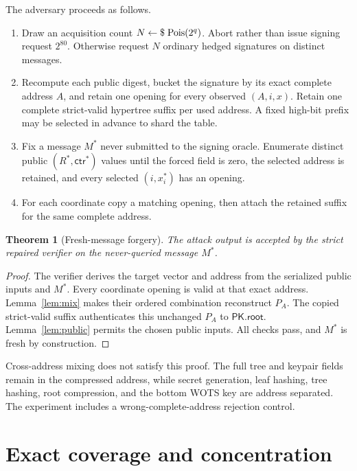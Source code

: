 \documentclass[11pt,a4paper]{article}
\newtheorem{theorem}{Theorem}
\newcommand{\sample}{\mathrel{\leftarrow\$}}
\newcommand{\pk}{\ensuremath{\mathsf{PK}}}
\newcommand{\Pois}{\mathop{\rm Pois}}
\begin{document}
The adversary proceeds as follows.
\begin{enumerate}[leftmargin=*,itemsep=2pt]
  \item Draw an acquisition count $N\sample\Pois(2^q)$.  Abort rather than
        issue signing request $2^{80}$.  Otherwise request $N$ ordinary hedged
        signatures on distinct messages.
  \item Recompute each public digest, bucket the signature by its exact
        complete address $A$, and retain one opening for every observed
        $(A,i,x)$.  Retain one complete strict-valid hypertree suffix per used
        address.  A fixed high-bit prefix may be selected in advance to shard
        the table.
  \item Fix a message $M^*$ never submitted to the signing oracle.  Enumerate
        distinct public $(R^*,\mathsf{ctr}^*)$ values until the forced field is
        zero, the selected address is retained, and every selected
        $(i,x_i^*)$ has an opening.
  \item For each coordinate copy a matching opening, then attach the retained
        suffix for the same complete address.
\end{enumerate}

\begin{theorem}[Fresh-message forgery]\label{thm:forge}
The attack output is accepted by the strict repaired verifier
on the never-queried message $M^*$.
\end{theorem}
\begin{proof}
The verifier derives the target vector and address from the serialized public
inputs and $M^*$.  Every coordinate opening is valid at that exact address.
Lemma~\ref{lem:mix} makes their ordered combination reconstruct $P_A$.  The
copied strict-valid suffix authenticates this unchanged $P_A$ to
$\pk.\mathsf{root}$.  Lemma~\ref{lem:public} permits the chosen public inputs.
All checks pass, and $M^*$ is fresh by construction.
\end{proof}

Cross-address mixing does not satisfy this proof.  The full tree and keypair
fields remain in the compressed address, while secret generation, leaf
hashing, tree hashing, root compression, and the bottom WOTS key are address
separated.  The experiment includes a wrong-complete-address rejection
control.

\section{Exact coverage and concentration}
\end{document}

